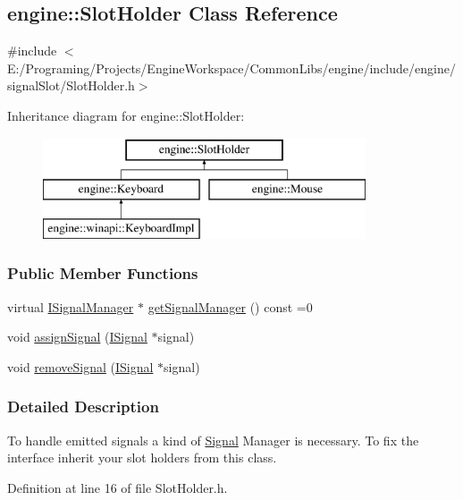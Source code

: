 \hypertarget{a00070}{}\subsection{engine\+:\+:Slot\+Holder Class Reference}
\label{a00070}


{\ttfamily \#include $<$E\+:/\+Programing/\+Projects/\+Engine\+Workspace/\+Common\+Libs/engine/include/engine/signal\+Slot/\+Slot\+Holder.\+h$>$}

Inheritance diagram for engine\+:\+:Slot\+Holder\+:\begin{figure}[H]
\begin{center}
\leavevmode
\includegraphics[height=3.000000cm]{a00070}
\end{center}
\end{figure}
\subsubsection*{Public Member Functions}
\begin{DoxyCompactItemize}
\item 
virtual \hyperlink{a00051}{I\+Signal\+Manager} $\ast$ \hyperlink{a00070_add6d89f31a2677b29a52f241d0431c13}{get\+Signal\+Manager} () const  =0
\item 
void \hyperlink{a00070_afd9ce54a72b4dd397d82aff6c387d0c0}{assign\+Signal} (\hyperlink{a00050}{I\+Signal} $\ast$signal)
\item 
void \hyperlink{a00070_a5927b57f0d4fb8744dc0e8ec265e0136}{remove\+Signal} (\hyperlink{a00050}{I\+Signal} $\ast$signal)
\end{DoxyCompactItemize}


\subsubsection{Detailed Description}
To handle emitted signals a kind of \hyperlink{a00065}{Signal} Manager is necessary. To fix the interface inherit your slot holders from this class. 

Definition at line 16 of file Slot\+Holder.\+h.



